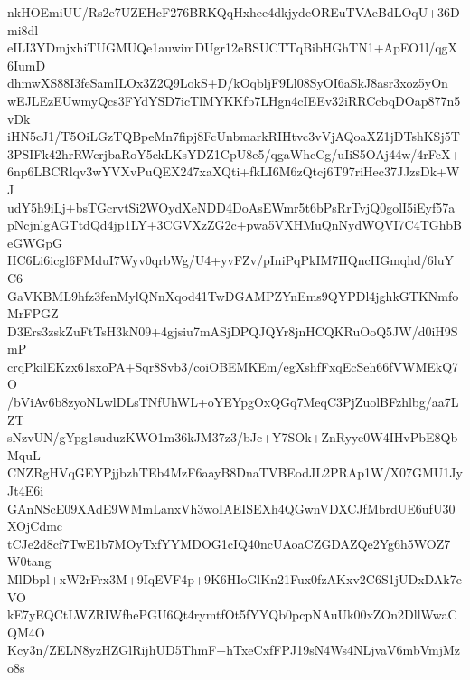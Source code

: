 nkHOEmiUU/Rs2e7UZEHcF276BRKQqHxhee4dkjydeOREuTVAeBdLOqU+36Dmi8dl
eILI3YDmjxhiTUGMUQe1auwimDUgr12eBSUCTTqBibHGhTN1+ApEO1l/qgX6IumD
dhmwXS88I3feSamILOx3Z2Q9LokS+D/kOqbljF9Ll08SyOI6aSkJ8asr3xoz5yOn
wEJLEzEUwmyQcs3FYdYSD7icTlMYKKfb7LHgn4cIEEv32iRRCcbqDOap877n5vDk
iHN5cJ1/T5OiLGzTQBpeMn7fipj8FcUnbmarkRIHtvc3vVjAQoaXZ1jDTshKSj5T
3PSIFk42hrRWcrjbaRoY5ckLKsYDZ1CpU8e5/qgaWhcCg/uIiS5OAj44w/4rFcX+
6np6LBCRlqv3wYVXvPuQEX247xaXQti+fkLI6M6zQtcj6T97riHec37JJzsDk+WJ
udY5h9iLj+bsTGcrvtSi2WOydXeNDD4DoAsEWmr5t6bPsRrTvjQ0golI5iEyf57a
pNcjnlgAGTtdQd4jp1LY+3CGVXzZG2c+pwa5VXHMuQnNydWQVI7C4TGhbBeGWGpG
HC6Li6icgl6FMduI7Wyv0qrbWg/U4+yvFZv/pIniPqPkIM7HQncHGmqhd/6luYC6
GaVKBML9hfz3fenMylQNnXqod41TwDGAMPZYnEms9QYPDl4jghkGTKNmfoMrFPGZ
D3Ers3zskZuFtTsH3kN09+4gjsiu7mASjDPQJQYr8jnHCQKRuOoQ5JW/d0iH9SmP
crqPkilEKzx61sxoPA+Sqr8Svb3/coiOBEMKEm/egXshfFxqEcSeh66fVWMEkQ7O
/bViAv6b8zyoNLwlDLsTNfUhWL+oYEYpgOxQGq7MeqC3PjZuolBFzhlbg/aa7LZT
sNzvUN/gYpg1suduzKWO1m36kJM37z3/bJc+Y7SOk+ZnRyye0W4IHvPbE8QbMquL
CNZRgHVqGEYPjjbzhTEb4MzF6aayB8DnaTVBEodJL2PRAp1W/X07GMU1JyJt4E6i
GAnNScE09XAdE9WMmLanxVh3woIAEISEXh4QGwnVDXCJfMbrdUE6ufU30XOjCdmc
tCJe2d8cf7TwE1b7MOyTxfYYMDOG1cIQ40ncUAoaCZGDAZQe2Yg6h5WOZ7W0tang
MlDbpl+xW2rFrx3M+9IqEVF4p+9K6HIoGlKn21Fux0fzAKxv2C6S1jUDxDAk7eVO
kE7yEQCtLWZRIWfhePGU6Qt4rymtfOt5fYYQb0pcpNAuUk00xZOn2DllWwaCQM4O
Kcy3n/ZELN8yzHZGlRijhUD5ThmF+hTxeCxfFPJ19sN4Ws4NLjvaV6mbVmjMzo8s

